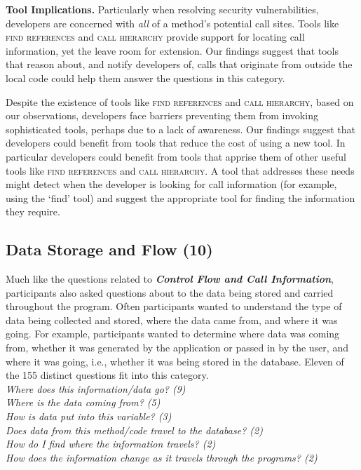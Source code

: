 \documentclass[conference]{IEEEtran}
\begin{document}
\noindent\textbf{Tool Implications.}
Particularly when resolving security vulnerabilities, developers are concerned with \textit{all} of a method's potential call sites.
Tools like \textsc{find references} and \textsc{call hierarchy} provide support for locating call information, yet the leave room for extension.
Our findings suggest that tools that reason about, and notify developers of, calls that originate from outside the local code could help them answer the questions in this category.

Despite the existence of tools like \textsc{find references} and \textsc{call hierarchy}, based on our observations, developers face barriers preventing them from invoking sophisticated tools, perhaps due to a lack of awareness.
Our findings suggest that developers could benefit from tools that reduce the cost of using a new tool.
In particular developers could benefit from tools that apprise them of other useful tools like \textsc{find references} and \textsc{call hierarchy}.
A tool that addresses these needs might detect when the developer is looking for call information (for example, using the `find' tool) and suggest the appropriate tool for finding the information they require. 




\noindent\subsection{\textbf{Data Storage and Flow (10)}}\label{dsf}
Much like the questions related to \emph{\textbf{Control Flow and Call Information}}, participants also asked questions about to the data being stored and carried throughout the program. 
Often participants wanted to understand the type of data being collected and stored, where the data came from, and where it was going. 
For example, participants wanted to determine where data was coming from, whether it was generated by the application or passed in by the user, and where it was going, i.e., whether it was being stored in the database.
Eleven of the 155 distinct questions fit into this category.
\\

\noindent\emph{Where does this information/data go? (9)} \\
\emph{Where is the data coming from? (5)} \\
\emph{How is data put into this variable? (3)} \\
\emph{Does data from this method/code travel to the database? (2)} \\
\emph{How do I find where the information travels? (2)} \\
\emph{How does the information change as it travels through the programs? (2)} \\
\end{document}
